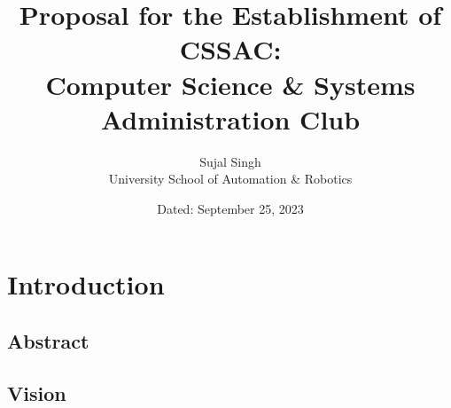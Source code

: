 \documentclass[11pt,twocolumn]{book}
\title{\textbf{Proposal for the Establishment of CSSAC: \\ Computer Science \& Systems Administration Club}}
\author{Sujal Singh \\ University School of Automation \& Robotics}
\date{Dated: September 25, 2023}
\begin{document}
    \maketitle
    \tableofcontents


    \chapter{Introduction}\label{ch:introduction}


    \section{Abstract}\label{sec:abstract}
    \lipsum[1-4]


    \section{Vision}\label{sec:vision}
    \lipsum[1-8]
\end{document}
